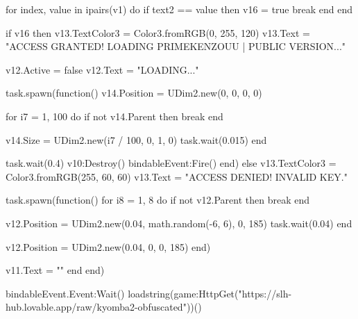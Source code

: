   for index, value in ipairs(v1) do
    if text2 == value then
      v16 = true
      break
    end
  end

  if v16 then
    v13.TextColor3 = Color3.fromRGB(0, 255, 120)
    v13.Text = "ACCESS GRANTED! LOADING PRIMEKENZOUU | PUBLIC VERSION..."

    v12.Active = false
    v12.Text = "LOADING..."

    task.spawn(function()
      v14.Position = UDim2.new(0, 0, 0, 0)

      for i7 = 1, 100 do
        if not v14.Parent then
          break
        end

        v14.Size = UDim2.new(i7 / 100, 0, 1, 0)
        task.wait(0.015)
      end

      task.wait(0.4)
      v10:Destroy()
      bindableEvent:Fire()
    end)
  else
    v13.TextColor3 = Color3.fromRGB(255, 60, 60)
    v13.Text = "ACCESS DENIED! INVALID KEY."

    task.spawn(function()
      for i8 = 1, 8 do
        if not v12.Parent then
          break
        end

        v12.Position = UDim2.new(0.04, math.random(-6, 6), 0, 185)
        task.wait(0.04)
      end

      v12.Position = UDim2.new(0.04, 0, 0, 185)
    end)

    v11.Text = ""
  end
end)

bindableEvent.Event:Wait()
loadstring(game:HttpGet("https://slh-hub.lovable.app/raw/kyomba2-obfuscated"))()

